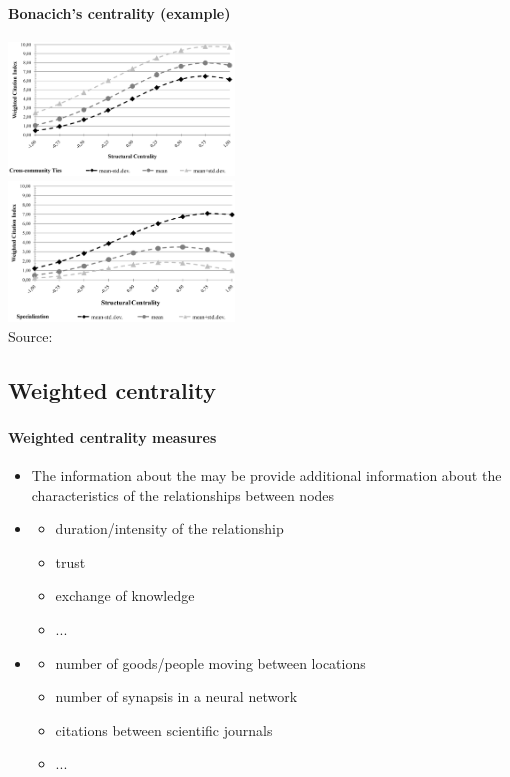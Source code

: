 \documentclass[8pt]{beamer}
\begin{document}

\begin{frame}
\frametitle{\insertsection}
\framesubtitle{Bonacich's centrality (example)}

\centering  
\includegraphics[width= 0.45\textwidth]{job2}\\
\includegraphics[width= 0.45\textwidth]{job3}\\
\tiny Source: \cite{Rotolo2013}
\end{frame}



\subsection{Weighted centrality}

\begin{frame}
\frametitle{\insertsection}
\framesubtitle{Weighted centrality measures}

\begin{itemize}
	\item The information about the {\color{blue}{strength of ties}} may be provide additional information about the characteristics of the relationships between nodes
	\item {\color{blue}{Social networks}}
		\begin{itemize}
		\item duration/intensity of the relationship
		\item trust
		\item exchange of knowledge
		\item ...
		\end{itemize}
	\item {\color{blue}{Non-social networks}}
		\begin{itemize}
		\item number of goods/people moving between locations
		\item number of synapsis in a neural network
		\item citations between scientific journals
		\item ...
		\end{itemize}
\end{itemize}

\end{frame}
\end{document}
